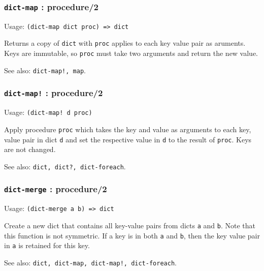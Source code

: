 \documentclass[
]{article}
\newcommand{\passthrough}[1]{#1}
\begin{document}
\hypertarget{dict-map-procedure2}{%
\subsubsection{\texorpdfstring{\texttt{dict-map} :
procedure/2}{dict-map : procedure/2}}\label{dict-map-procedure2}}

Usage: \passthrough{\lstinline!(dict-map dict proc) => dict!}

Returns a copy of \passthrough{\lstinline!dict!} with
\passthrough{\lstinline!proc!} applies to each key value pair as
aruments. Keys are immutable, so \passthrough{\lstinline!proc!} must
take two arguments and return the new value.

See also: \passthrough{\lstinline"dict-map!, map"}.

\hypertarget{dict-map-procedure2-1}{%
\subsubsection{\texorpdfstring{\texttt{dict-map!} :
procedure/2}{dict-map! : procedure/2}}\label{dict-map-procedure2-1}}

Usage: \passthrough{\lstinline"(dict-map! d proc)"}

Apply procedure \passthrough{\lstinline!proc!} which takes the key and
value as arguments to each key, value pair in dict
\passthrough{\lstinline!d!} and set the respective value in
\passthrough{\lstinline!d!} to the result of
\passthrough{\lstinline!proc!}. Keys are not changed.

See also: \passthrough{\lstinline!dict, dict?, dict-foreach!}.

\hypertarget{dict-merge-procedure2}{%
\subsubsection{\texorpdfstring{\texttt{dict-merge} :
procedure/2}{dict-merge : procedure/2}}\label{dict-merge-procedure2}}

Usage: \passthrough{\lstinline!(dict-merge a b) => dict!}

Create a new dict that contains all key-value pairs from dicts
\passthrough{\lstinline!a!} and \passthrough{\lstinline!b!}. Note that
this function is not symmetric. If a key is in both
\passthrough{\lstinline!a!} and \passthrough{\lstinline!b!}, then the
key value pair in \passthrough{\lstinline!a!} is retained for this key.

See also:
\passthrough{\lstinline"dict, dict-map, dict-map!, dict-foreach"}.
\end{document}
